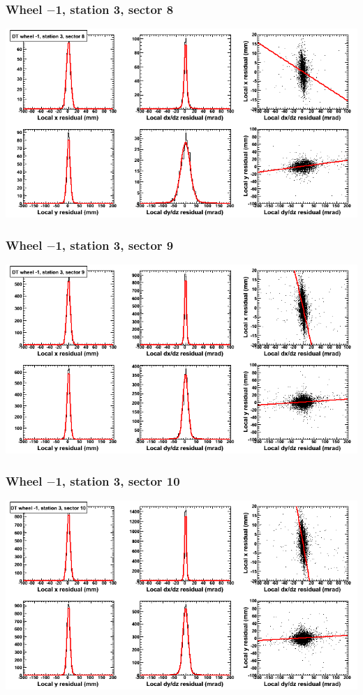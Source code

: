 \documentclass[compress]{beamer}
\begin{document}
\begin{frame}
\frametitle{Wheel $-$1, station 3, sector 8}
\includegraphics[width=\linewidth]{tmpbell_MBwhBst3sec08.png}
\end{frame}

\begin{frame}
\frametitle{Wheel $-$1, station 3, sector 9}
\includegraphics[width=\linewidth]{tmpbell_MBwhBst3sec09.png}
\end{frame}

\begin{frame}
\frametitle{Wheel $-$1, station 3, sector 10}
\includegraphics[width=\linewidth]{tmpbell_MBwhBst3sec10.png}
\end{frame}
\end{document}
